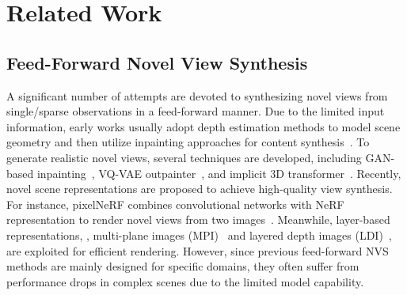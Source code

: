 \section{Related Work}
\subsection{Feed-Forward Novel View Synthesis}
A significant number of attempts are devoted to synthesizing novel views from single/sparse observations in a feed-forward manner. Due to the limited input information, early works usually adopt depth estimation methods to model scene geometry and then utilize inpainting approaches for content synthesis~\cite{wiles2020synsin,rombach2021geometry,rockwell2021pixelsynth}. To generate realistic novel views, several techniques are developed, including GAN-based inpainting~\cite{wiles2020synsin}, VQ-VAE outpainter~\cite{rockwell2021pixelsynth}, and implicit 3D transformer~\cite{rombach2021geometry}. Recently, novel scene representations are proposed to achieve high-quality view synthesis. For instance, pixelNeRF combines convolutional networks with NeRF representation to render novel views from two images~\cite{yu2021pixelnerf}. Meanwhile, layer-based representations, \eg, multi-plane images (MPI)~\cite{li2021mine,tucker2020svmpi,adampi,khan2023tiled} and layered depth images (LDI)~\cite{shih20203dphoto,jiang2023diffuse3d}, are exploited for efficient rendering.
However, since previous feed-forward NVS methods are mainly designed for specific domains, they often suffer from performance drops in complex scenes due to the limited model capability.

